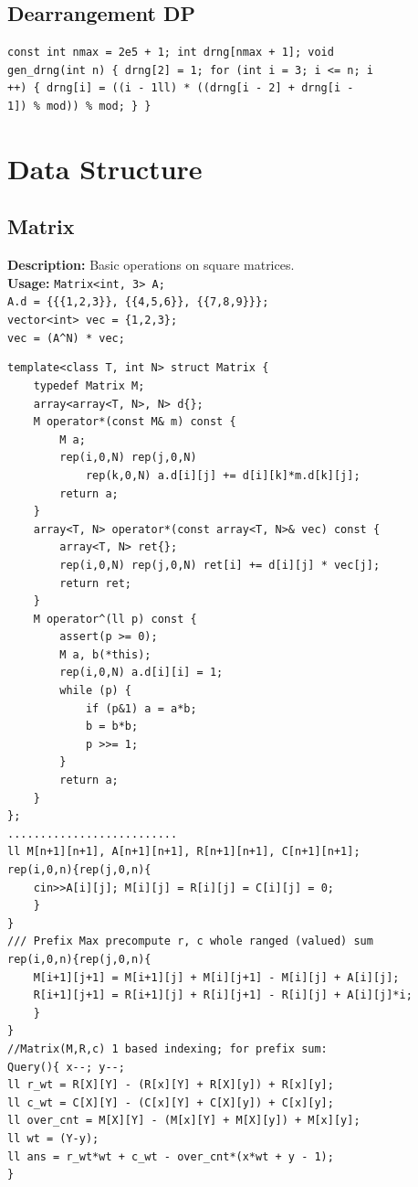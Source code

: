 \documentclass[a4paper,11pt,oneside]{article}
\begin{document}
\begin{multicols*}{\COLS}
\subsection{Dearrangement DP}
\begin{lstlisting}
const int nmax = 2e5 + 1; int drng[nmax + 1]; void
gen_drng(int n) { drng[2] = 1; for (int i = 3; i <= n; i
++) { drng[i] = ((i - 1ll) * ((drng[i - 2] + drng[i -
1]) % mod)) % mod; } }
\end{lstlisting}

\section{Data Structure}
\subsection{Matrix}
\textbf{Description:} Basic operations on square matrices. \\
\textbf{Usage: }\texttt{Matrix<int, 3> A;} \\
\texttt{A.d = \{\{\{1,2,3\}\}, \{\{4,5,6\}\}, \{\{7,8,9\}\}\};} \\
\texttt{vector<int> vec = \{1,2,3\};} \\
\texttt{vec = (A\^{}N) * vec;}
\begin{lstlisting}
template<class T, int N> struct Matrix {
	typedef Matrix M;
	array<array<T, N>, N> d{};
	M operator*(const M& m) const {
		M a;
		rep(i,0,N) rep(j,0,N)
			rep(k,0,N) a.d[i][j] += d[i][k]*m.d[k][j];
		return a;
	}
	array<T, N> operator*(const array<T, N>& vec) const {
		array<T, N> ret{};
		rep(i,0,N) rep(j,0,N) ret[i] += d[i][j] * vec[j];
		return ret;
	}
	M operator^(ll p) const {
		assert(p >= 0);
		M a, b(*this);
		rep(i,0,N) a.d[i][i] = 1;
		while (p) {
			if (p&1) a = a*b;
			b = b*b;
			p >>= 1;
		}
		return a;
	}
};
..........................
ll M[n+1][n+1], A[n+1][n+1], R[n+1][n+1], C[n+1][n+1]; 
rep(i,0,n){rep(j,0,n){
    cin>>A[i][j]; M[i][j] = R[i][j] = C[i][j] = 0;
    }
}
/// Prefix Max precompute r, c whole ranged (valued) sum
rep(i,0,n){rep(j,0,n){
    M[i+1][j+1] = M[i+1][j] + M[i][j+1] - M[i][j] + A[i][j];
    R[i+1][j+1] = R[i+1][j] + R[i][j+1] - R[i][j] + A[i][j]*i;
    }
}
//Matrix(M,R,c) 1 based indexing; for prefix sum:
Query(){ x--; y--;
ll r_wt = R[X][Y] - (R[x][Y] + R[X][y]) + R[x][y];
ll c_wt = C[X][Y] - (C[x][Y] + C[X][y]) + C[x][y];
ll over_cnt = M[X][Y] - (M[x][Y] + M[X][y]) + M[x][y];
ll wt = (Y-y);
ll ans = r_wt*wt + c_wt - over_cnt*(x*wt + y - 1);
}
\end{lstlisting}

\end{multicols*}
\end{document}
